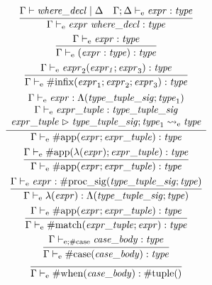 \begin{gather*}
    \infer{\Gamma \vdash_\mathrm{e} \mathit{expr}\; \mathit{where\_decl}: \mathit{type}}{
        \Gamma \vdash \mathit{where\_decl} \mid \Delta
        &
        \Gamma; \Delta \vdash_\mathrm{e} \mathit{expr}: \mathit{type}
    }
    \\
    \infer{\Gamma \vdash_\mathrm{e} (\mathit{expr}: \mathit{type}): \mathit{type}}{
        \Gamma \vdash_\mathrm{e} \mathit{expr}: \mathit{type}
    }
    \\
    \infer{\Gamma \vdash_\mathrm{e} \mathrm{\#infix}(\mathit{expr}_1; \mathit{expr}_2; \mathit{expr}_3): \mathit{type}}{
        \Gamma \vdash_\mathrm{e} \mathit{expr}_2(\mathit{expr_1}; \mathit{expr}_3): \mathit{type}
    }
    \\
    \infer{\Gamma \vdash_\mathrm{e} \mathrm{\#app}(\mathit{expr}; \mathit{expr\_tuple}): \mathit{type}}{
        \begin{array}{c}
            \Gamma \vdash_\mathrm{e} \mathit{expr}: \Lambda(\mathit{type\_tuple\_sig}; \mathit{type}_1)
            \\
            \Gamma \vdash_\mathrm{e} \mathit{expr\_tuple}: \mathit{type\_tuple\_sig}
            \\
            \mathit{expr\_tuple} \vartriangleright \mathit{type\_tuple\_sig}; \mathit{type}_1 \rightsquigarrow_\mathrm{e} \mathit{type}
        \end{array}
    }
    \\
    \infer{\Gamma \vdash_\mathrm{e} \mathrm{\#app}(\mathit{expr}; \mathit{expr\_tuple}): \mathit{type}}{
        \Gamma \vdash_\mathrm{e} \mathrm{\#app}(\lambda(\mathit{expr}); \mathit{expr\_tuple}): \mathit{type}
    }
    \\
    \infer{\Gamma \vdash_\mathrm{e} \lambda(\mathit{expr}): \Lambda(\mathit{type\_tuple\_sig}; \mathit{type})}{
        \Gamma \vdash_\mathrm{e} \mathit{expr}: \mathrm{\#proc\_sig}(\mathit{type\_tuple\_sig}; \mathit{type})
    }
    \\
    \infer{\Gamma \vdash_\mathrm{e} \mathrm{\#match}(\mathit{expr\_tuple}; \mathit{expr}): \mathit{type}}{
        \Gamma \vdash_\mathrm{e} \mathrm{\#app}(\mathit{expr}; \mathit{expr\_tuple}): \mathit{type}
    }
    \\
    \infer{\Gamma \vdash_\mathrm{e} \mathrm{\#case}(\mathit{case\_body}): \mathit{type}}{
        \Gamma \vdash_{\mathrm{e}; \mathrm{\#case}} \mathit{case\_body}: \mathit{type}
    }
    \\
    \infer{\Gamma \vdash_\mathrm{e} \mathrm{\#when}(\mathit{case\_body}): \mathrm{\#tuple}()}{
}
\end{gather*}
